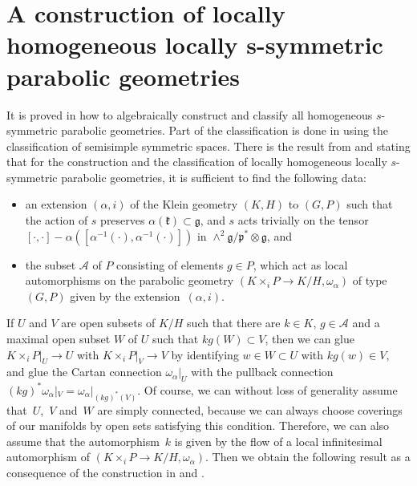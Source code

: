 \documentclass[pdftex]{sigma}
\newcommand{\om}{\omega}
\newcommand{\fg}{\mathfrak g}
\newcommand{\fp}{\mathfrak p}
\newcommand{\fk}{\mathfrak k}
\numberwithin{equation}{section}
\begin{document}
\appendix

\section[A construction of locally homogeneous locally $s$-symmetric parabolic geometries]{A construction of locally homogeneous locally $\boldsymbol{s}$-symmetric\\ parabolic geometries}\label{sec5}

It is proved in \cite[Section 2]{GZ2} how to algebraically construct and classify all homogeneous $s$-symmetric parabolic geometries. Part of the classif\/ication is done in \cite{G2,G3} using the classif\/ication of semisimple symmetric spaces. There is the result from \cite[Section~1.3]{disertace} and \cite[Lemma~2.2]{GZ2} stating that for the construction and the classif\/ication of locally homogeneous locally $s$-symmetric parabolic geometries, it is suf\/f\/icient to f\/ind the following data:
\begin{itemize}\itemsep=0pt
\item an extension $(\alpha,i)$ of the Klein geometry $(K,H)$ to $(G,P)$ such that the action of $s$ preserves $\alpha(\fk)\subset \fg$, and $s$ acts trivially on the tensor $[\cdot ,\cdot ]-\alpha([\alpha^{-1}(\cdot ),\alpha^{-1}(\cdot )])$ in $\wedge^2 \fg/\fp^*\otimes \fg$, and
\item the subset $\mathcal{A}$ of $P$ consisting of elements $g\in P$, which act as local automorphisms on the parabolic geometry $(K\times_{i}P\to K/H,\om_\alpha)$ of type $(G,P)$ given by the extension~$(\alpha,i)$.
\end{itemize}

If $U$ and $V$ are open subsets of $K/H$ such that there are $k\in K$, $g\in\mathcal{A}$ and a maximal open subset $W$ of $U$ such that $kg(W)\subset V$, then we can glue $K\times_{i}P|_U\to U$ with $K\times_{i}P|_V\to V$ by identifying $w\in W\subset U$ with $kg(w)\in V$, and glue the Cartan connection $\om_\alpha|_U$ with the pullback connection $(kg)^*\om_\alpha|_V=\om_\alpha|_{(kg)^*(V)}$. Of course, we can without loss of generality assume that~$U$,~$V$ and~$W$ are simply connected, because we can always choose coverings of our manifolds by open sets satisfying this condition. Therefore, we can also assume that the automorphism~$k$ is given by the f\/low of a local inf\/initesimal automorphism of $(K\times_{i}P\to K/H,\om_\alpha)$. Then we obtain the following result as a consequence of the construction in \cite[Section~3]{GZ3} and \cite[Section~1.3]{disertace}.
\end{document}
